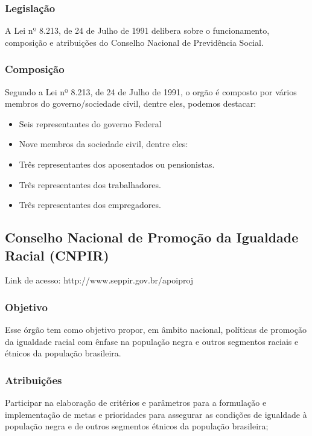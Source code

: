\subsubsection*{Legislação}


A Lei nº 8.213, de 24 de Julho de 1991 delibera sobre
o funcionamento, composição e atribuições do Conselho
Nacional de Previdência Social.


\subsubsection*{Composição}


Segundo a Lei nº 8.213, de 24 de Julho de 1991, o
orgão é composto por vários membros do governo/sociedade civil,
dentre eles, podemos destacar:

\begin{itemize}
\item 
Seis representantes do governo Federal
\item 
Nove membros da sociedade civil, dentre eles:
\item 
Três representantes dos aposentados ou pensionistas.
\item 
Três representantes dos trabalhadores.
\item 
Três representantes dos empregadores.
\end{itemize}
\newpage
\subsection*{Conselho Nacional de Promoção da Igualdade Racial (CNPIR)}

Link de acesso: http://www.seppir.gov.br/apoiproj


\subsubsection*{Objetivo}

Esse órgão tem como objetivo propor, em âmbito nacional,
políticas de promoção da igualdade racial com ênfase na
população negra e outros segmentos raciais e étnicos da
população brasileira.


\subsubsection*{Atribuições}

Participar na elaboração de
critérios e parâmetros para a formulação e
implementação de metas e prioridades para assegurar as
condições de igualdade à população negra e de outros
segmentos étnicos da população brasileira;

